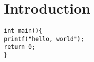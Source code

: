 \chapter{Introduction}
\lipsum[1]

\begin{verbatim}
int main(){
printf("hello, world");
return 0;
}
\end{verbatim}


